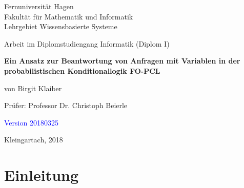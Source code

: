 \documentclass[a4paper, 11pt]{book}
\begin{document}
\begin{titlepage}
\thispagestyle{empty}
\begin{center}
\Large{Fernuniversität Hagen}\\
\Large{Fakultät für Mathematik und Informatik}\\
\Large{Lehrgebiet Wissensbasierte Systeme}\\[1.5cm]
\end{center}


\begin{center}
{Arbeit im Diplomstudiengang Informatik (Diplom I)}\\[2.0cm]
\end{center}

\begin{center}


\LARGE \textbf{Ein Ansatz zur Beantwortung von Anfragen mit Variablen in der probabilistischen Konditionallogik FO-PCL}\\[3.5cm]
\end{center}


\begin{center}
\large{von Birgit Klaiber}\\[3.5cm]
\end{center}

\begin{center}
\large{Prüfer: Professor Dr. Christoph Beierle }\\[1.0cm]
\end{center}

\begin{center}
\textcolor{blue}{Version 20180325}
	
\large{Kleingartach, 2018}
\end{center}

\end{titlepage}






\begingroup



\setcounter{tocdepth}{1}

\tableofcontents
\clearpage
\endgroup
{}
\pagestyle{plain}
\setcounter{page}{1}
\pagestyle{headings}


\setlength{\parskip}{5pt}




\chapter{Einleitung}
\end{document}
